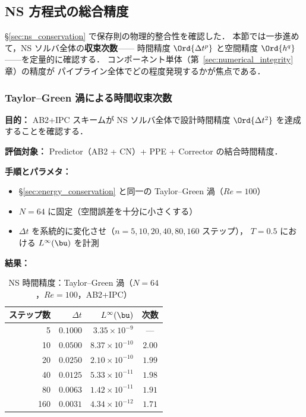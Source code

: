 %
\subsection{NS 方程式の総合精度}
\label{sec:ns_time_accuracy}

§\ref{sec:ns_conservation} で保存則の物理的整合性を確認した．
本節では一歩進めて，NS ソルバ全体の\textbf{収束次数}——
時間精度 $\Ord{\Delta t^p}$ と空間精度 $\Ord{h^q}$ ——を定量的に確認する．
コンポーネント単体（第~\ref{sec:numerical_integrity}章）の精度が
パイプライン全体でどの程度発現するかが焦点である．

\subsubsection{Taylor--Green 渦による時間収束次数}
\label{sec:tgv_temporal}

\noindent\textbf{目的：}
AB2+IPC スキームが NS ソルバ全体で設計時間精度 $\Ord{\Delta t^2}$ を達成することを確認する．

\noindent\textbf{評価対象：}
Predictor（AB2 + CN）+ PPE + Corrector の結合時間精度．

\noindent\textbf{手順とパラメタ：}
\begin{itemize}[noitemsep]
  \item §\ref{sec:energy_conservation} と同一の Taylor--Green 渦（$\mathit{Re}=100$）
  \item $N = 64$ に固定（空間誤差を十分に小さくする）
  \item $\Delta t$ を系統的に変化させ（$n = 5, 10, 20, 40, 80, 160$ ステップ），
        $T = 0.5$ における $L^\infty(\bu)$ を計測
\end{itemize}

\noindent\textbf{結果：}

\begin{table}[htbp]
\centering
\caption{NS 時間精度：Taylor--Green 渦（$N=64$，$\mathit{Re}=100$，AB2+IPC）}
\label{tab:tgv_temporal}
\renewcommand{\arraystretch}{1.3}
\begin{tabular}{rrrc}
\toprule
ステップ数 & $\Delta t$ & $L^\infty(\bu)$ & 次数 \\
\midrule
  5  & $0.1000$ & $3.35 \times 10^{-9}$  & --- \\
 10  & $0.0500$ & $8.37 \times 10^{-10}$ & $2.00$ \\
 20  & $0.0250$ & $2.10 \times 10^{-10}$ & $1.99$ \\
 40  & $0.0125$ & $5.33 \times 10^{-11}$ & $1.98$ \\
 80  & $0.0063$ & $1.42 \times 10^{-11}$ & $1.91$ \\
160  & $0.0031$ & $4.34 \times 10^{-12}$ & $1.71$ \\
\bottomrule
\end{tabular}
\end{table}


